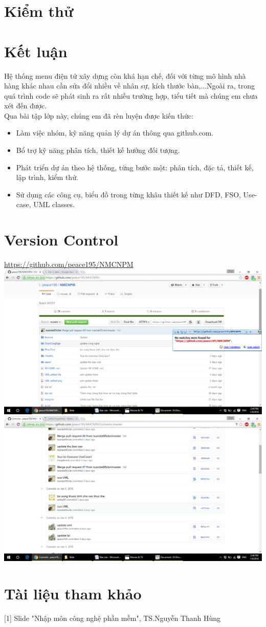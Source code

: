 \documentclass[a4paper,12pt]{report}
\begin{document}
\chapter{Kiểm thử}
\chapter{Kết luận}
Hệ thống menu điện tử xây dựng còn khá hạn chế, đối với từng mô hình nhà hàng khác nhau cần sửa đổi nhiều về nhân sự, kích thước bàn,...Ngoài ra, trong quá trình code sẽ phát sinh ra rất nhiều trường hợp, tiểu tiết mà chúng em chưa xét đến được.\\

Qua bài tập lớp này, chúng em đã rèn luyện được kiến thức:
\begin{itemize}
	\item Làm việc nhóm, kỹ năng quản lý dự án thông qua github.com.
	\item Bổ trợ kỹ năng phân tích, thiết kế hướng đối tượng.
	\item Phát triển dự án theo hệ thống, từng bước một: phân tích, đặc tả, thiết kế, lập trình, kiểm thử. 
	\item Sử dụng các công cụ, biểu đồ trong từng khâu thiết kế như DFD, FSO, Use-case, UML classes.
\end{itemize}

\chapter{Version Control}
\begin{center}
\hyperref[label_name]{https://github.com/peace195/NMCNPM}\\
\includegraphics[scale=0.4]{vc1.png}\\
\includegraphics[scale=0.4]{vc2.png}
\end{center}
\chapter*{Tài liệu tham khảo}
{}
[1] Slide "Nhập môn công nghệ phần mềm", TS.Nguyễn Thanh Hùng
\end{document}
